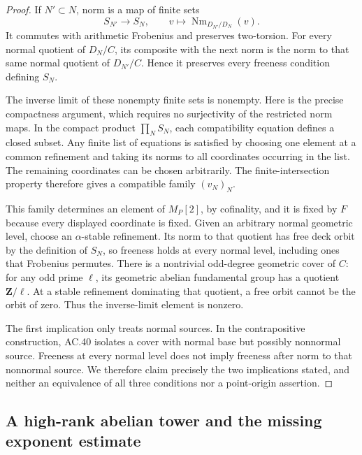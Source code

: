 \begin{proof}
If $N'\subset N$, norm is a map of finite sets
\[
        S_{N'}\longrightarrow S_N,
        \qquad v\longmapsto\operatorname{Nm}_{D_{N'}/D_N}(v).
\]
It commutes with arithmetic Frobenius and preserves
two-torsion. For every normal quotient of $D_N/C$, its
composite with the next norm is the norm to that same normal
quotient of $D_{N'}/C$. Hence it preserves every freeness
condition defining $S_N$.

The inverse limit of these nonempty finite sets is nonempty.
Here is the precise compactness argument, which requires no
surjectivity of the restricted norm maps. In the compact
product $\prod_N S_N$, each compatibility equation defines a
closed subset. Any finite list of equations is satisfied by
choosing one element at a common refinement and taking its
norms to all coordinates occurring in the list. The remaining
coordinates can be chosen arbitrarily. The finite-intersection
property therefore gives a compatible family $(v_N)_N$.

This family determines an element of $M_P[2]$, by cofinality,
and it is fixed by $F$ because every displayed coordinate is
fixed. Given an arbitrary normal geometric level, choose an
$\alpha$-stable refinement. Its norm to that quotient has
free deck orbit by the definition of $S_N$, so freeness holds
at every normal level, including ones that Frobenius permutes.
There is a nontrivial odd-degree geometric cover of $C$:
for any odd prime $\ell$, its geometric abelian fundamental
group has a quotient $\mathbf Z/\ell$. At a stable refinement
dominating that quotient, a free orbit cannot be the orbit
of zero. Thus the inverse-limit element is nonzero.

The first implication only treats normal sources. In the
contrapositive construction, AC.40 isolates a cover with
normal base but possibly nonnormal source. Freeness at every
normal level does not imply freeness after norm to that
nonnormal source. We therefore claim precisely the two
implications stated, and neither an equivalence of all three
conditions nor a point-origin assertion.
\end{proof}

\subsection{A high-rank abelian tower and the missing exponent estimate}

